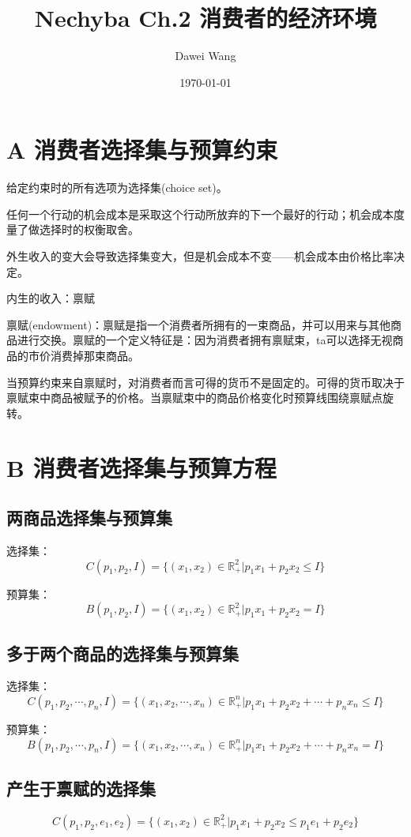 \documentclass{article}
\title{Nechyba Ch.2 消费者的经济环境}
\author{Dawei Wang}
\date{\today}
\begin{document}
	\maketitle
\section{A 消费者选择集与预算约束}
给定约束时的所有选项为选择集(choice set)。

任何一个行动的机会成本是采取这个行动所放弃的下一个最好的行动；机会成本度量了做选择时的权衡取舍。

外生收入的变大会导致选择集变大，但是机会成本不变——机会成本由价格比率决定。

\hspace*{\fill}

内生的收入：禀赋


禀赋(endowment)：禀赋是指一个消费者所拥有的一束商品，并可以用来与其他商品进行交换。禀赋的一个定义特征是：因为消费者拥有禀赋束，ta可以选择无视商品的市价消费掉那束商品。

\hspace*{\fill}

当预算约束来自禀赋时，对消费者而言可得的货币不是固定的。可得的货币取决于禀赋束中商品被赋予的价格。当禀赋束中的商品价格变化时预算线围绕禀赋点旋转。

\section{B 消费者选择集与预算方程}
\subsection{两商品选择集与预算集}
选择集：
\[
C(p_1,p_2,I)=\{(x_1,x_2)\in\mathbb{R}^2_+|p_1x_1+p_2x_2\le I\}
\]

预算集：
\[
B(p_1,p_2,I)=\{(x_1,x_2)\in\mathbb{R}^2_+|p_1x_1+p_2x_2=I\}
\]
\subsection{多于两个商品的选择集与预算集}
选择集：
\[
C(p_1,p_2,\cdots,p_n,I)=\{(x_1,x_2,\cdots,x_n)\in\mathbb{R}^n_+|p_1x_1+p_2x_2+\cdots+p_nx_n\le I\}
\]

预算集：
\[
B(p_1,p_2,\cdots,p_n,I)=\{(x_1,x_2,\cdots,x_n)\in\mathbb{R}^n_+|p_1x_1+p_2x_2+\cdots+p_nx_n=I\}
\]
\subsection{产生于禀赋的选择集}
\[
C(p_1,p_2,e_1,e_2)=\{(x_1,x_2)\in\mathbb{R}^2_+|p_1x_1+p_2x_2\le p_1e_1+p_2e_2\}
\]
\end{document}
